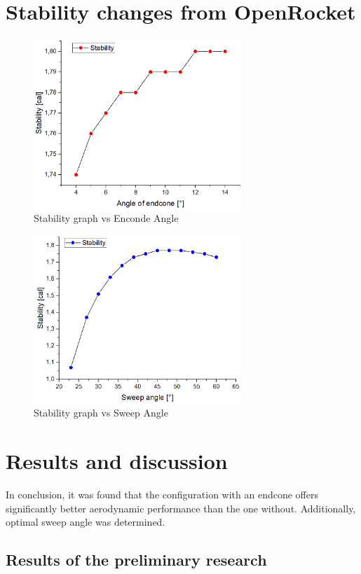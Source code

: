\documentclass{article}
\begin{document}
\section{Stability changes from OpenRocket}
\begin{figure}[H]
    \centering
    \includegraphics[width=0.7\textwidth]{../data/OR/EndconeStability.png}
    \caption{Stability graph vs Enconde Angle}
\end{figure}
\begin{figure}[H]
    \centering
    \includegraphics[width=0.7\textwidth]{../data/OR/FinStability.png}
    \caption{Stability graph vs Sweep Angle}
\end{figure}
\section{Results and discussion}
In conclusion, it was found that the configuration with an endcone offers significantly better 
aerodynamic performance than the one without. Additionally, optimal sweep angle was determined.
\subsection{Results of the preliminary research}
\end{document}
